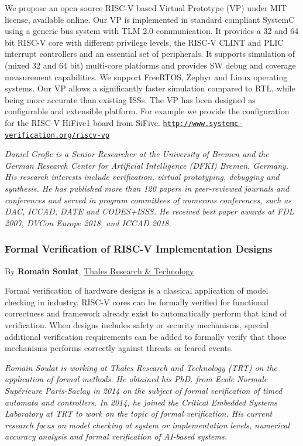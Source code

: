 \documentclass[a4paper, 10pt]{article}
\begin{document}
{We propose an open source RISC-V based Virtual Prototype (VP) under
MIT license, available online. Our VP is implemented in standard
compliant SystemC using a generic bus system with TLM 2.0
communication. It provides a 32 and 64 bit RISC-V core with
different privilege levels, the RISC-V CLINT and PLIC interrupt
controllers and an essential set of peripherals. It supports
simulation of (mixed 32 and 64 bit) multi-core platforms and provides
SW debug and coverage measurement capabilities. We support FreeRTOS,
Zephyr and Linux operating systems. Our VP allows a significantly
faster simulation compared to RTL, while being more accurate than
existing ISSs. The VP has been designed as configurable and extensible
platform. For example we provide the configuration for the RISC-V
HiFive1 board from
SiFive. \href{http://www.systemc-verification.org/riscv-vp}{\texttt{http://www.systemc-verification.org/riscv-vp}}

\emph{\footnotesize Daniel Große is a Senior Researcher at the University of Bremen and the German Research Center for Artificial Intelligence (DFKI) Bremen, Germany. His research interests include verification, virtual prototyping, debugging and synthesis. He has published more than 120 papers in peer-reviewed journals and conferences and served in program committees of numerous conferences, such as DAC, ICCAD, DATE and CODES+ISSS. He received best paper awards at FDL 2007, DVCon Europe 2018, and ICCAD 2018.}

\subsubsection{Formal Verification of RISC-V Implementation Designs}
\label{sec:org8b4a799}
By
\textbf{Romain Soulat}, \href{https://www.thalesgroup.com/en/global/innovation/research-and-technology}{Thales Research \& Technology}

Formal verification of hardware designs is a classical application of model
checking in industry. RISC-V cores can be formally verified for functional
correctness and framework already exist to automatically perform that kind of
verification. When designs includes safety or security mechanisms, special
additional verification requirements can be added to formally verify that those
mechanisms performs correctly against threats or feared events.

\emph{\footnotesize Romain Soulat is working at Thales Research and Technology (TRT) on the application of formal methods. He obtained his PhD. from Ecole Normale Supérieure Paris-Saclay in 2014 on the subject of formal verification of timed automata and controllers. In 2014, he joined the Critical Embedded Systems Laboratory at TRT to work on the topic of formal verification. His current research focus on model checking at system or implementation levels, numerical accuracy analysis and formal verification of AI-based systems.}

} %
\end{document}
